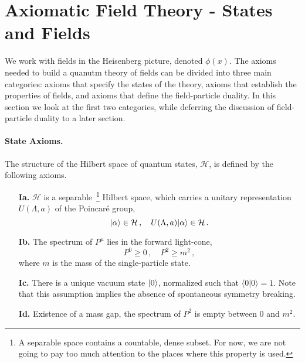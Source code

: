\section{Axiomatic Field Theory - States and Fields}
\label{sec:AFTONe}

We work with fields in the Heisenberg picture, denoted $\phi(x)$. The axioms
needed to build a quanutm theory of fields can be divided into three main
categories: axioms that specify the states of the theory, axioms that establish
the properties of fields, and axioms that define the field-particle duality. In
this section we look at the first two categories, while deferring the discussion
of field-particle duality to a later section. 

\paragraph{State Axioms.}

The structure of the Hilbert space of quantum states, $\mathcal{H}$, is defined
by the following axioms. 

\begin{enumerate}
    \item [{\bf Ia.}] $\mathcal{H}$ is a separable~\footnote{
        A separable space contains a countable, dense subset. For now, we are not 
        going to pay too much attention to the places where this property is used. 
    } Hilbert space, which carries
    a unitary representation $U(\Lambda,a)$ of the Poincar\'e group, 
    \begin{equation}
        \label{eq:PoincaRep}
        | \alpha \rangle \in \mathcal{H}\, , \quad U(\Lambda,a) | \alpha \rangle \in \mathcal{H}\, .
    \end{equation}
    
    \item [{\bf Ib.}] The spectrum of $P^\mu$ lies in the forward light-cone,
    \begin{equation}
        \label{eq:ForwSpec}
        P^0 \geq 0\, , \quad P^2 \geq m^2\, ,
    \end{equation}
    where $m$ is the mass of the single-particle state. 

    \item [{\bf Ic.}] There is a unique vacuum state $| 0 \rangle$, normalized such that $\langle 0 | 0\rangle = 1$. Note that this assumption implies the absence of spontaneous symmetry breaking. 
    
    \item [{\bf Id.}] Existence of a mass gap, the spectrum of $P^2$ is empty between 0 and $m^2$.
\end{enumerate}

